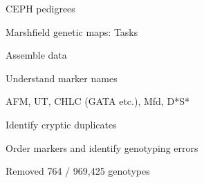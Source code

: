 \documentclass[12pt,t]{beamer}
\begin{document}
\begin{frame}[c]{CEPH pedigrees}


\end{frame}




\begin{frame}{Marshfield genetic maps: Tasks}

\bbi
\item Assemble data

\item Understand marker names

  \bi
  \item[] AFM, UT, CHLC (GATA etc.), Mfd, D*S*
  \ei

\item Identify cryptic duplicates

\item Order markers and identify genotyping errors

  \bi
  \item[] Removed 764 / 969,425 genotypes
  \ei
\ei

\end{frame}
\end{document}
